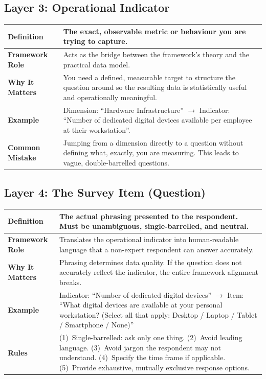 \documentclass[12pt,a4paper]{article}
\begin{document}
\subsection{Layer 3: Operational Indicator}

\begin{table}[H]\centering\small
\begin{tabularx}{\textwidth}{L{3cm} X}
\toprule
\textbf{Definition} & The exact, observable metric or behaviour you are trying to capture. \\
\midrule
\textbf{Framework Role} & Acts as the bridge between the framework's theory and the practical data model. \\
\midrule
\textbf{Why It Matters} & You need a defined, measurable target to structure the question around so the resulting data is statistically useful and operationally meaningful. \\
\midrule
\textbf{Example} & Dimension: ``Hardware Infrastructure'' $\rightarrow$ Indicator: ``Number of dedicated digital devices available per employee at their workstation''. \\
\midrule
\textbf{Common Mistake} & Jumping from a dimension directly to a question without defining what, exactly, you are measuring. This leads to vague, double-barrelled questions. \\
\bottomrule
\end{tabularx}
\end{table}

\subsection{Layer 4: The Survey Item (Question)}

\begin{table}[H]\centering\small
\begin{tabularx}{\textwidth}{L{3cm} X}
\toprule
\textbf{Definition} & The actual phrasing presented to the respondent. Must be unambiguous, single-barrelled, and neutral. \\
\midrule
\textbf{Framework Role} & Translates the operational indicator into human-readable language that a non-expert respondent can answer accurately. \\
\midrule
\textbf{Why It Matters} & Phrasing determines data quality. If the question does not accurately reflect the indicator, the entire framework alignment breaks. \\
\midrule
\textbf{Example} & Indicator: ``Number of dedicated digital devices'' $\rightarrow$ Item: ``What digital devices are available at your personal workstation? (Select all that apply: Desktop / Laptop / Tablet / Smartphone / None)'' \\
\midrule
\textbf{Rules} & (1)~Single-barrelled: ask only one thing. (2)~Avoid leading language. (3)~Avoid jargon the respondent may not understand. (4)~Specify the time frame if applicable. (5)~Provide exhaustive, mutually exclusive response options. \\
\bottomrule
\end{tabularx}
\end{table}
\end{document}
